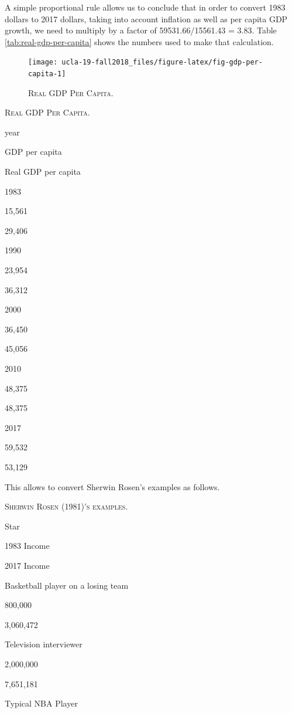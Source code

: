\documentclass[]{book}
\theoremstyle{definition}
\theoremstyle{definition}
\theoremstyle{definition}
\theoremstyle{remark}
\begin{document}
A simple proportional rule allows us to conclude that in order to
convert 1983 dollars to 2017 dollars, taking into account inflation as
well as per capita GDP growth, we need to multiply by a factor of
59531.66/15561.43 = 3.83. Table \ref{tab:real-gdp-per-capita} shows the
numbers used to make that calculation.



\begin{figure}

{\centering \texttt{[image: ucla-19-fall2018\_files/figure-latex/fig-gdp-per-capita-1]} 

}

\caption{\textsc{Real GDP Per Capita.}}\label{fig:fig-gdp-per-capita}
\end{figure}



\label{tab:real-gdp-per-capita}\textsc{Real GDP Per Capita.}

year

GDP per capita

Real GDP per capita

1983

15,561

29,406

1990

23,954

36,312

2000

36,450

45,056

2010

48,375

48,375

2017

59,532

53,129

This allows to convert Sherwin Rosen's examples as follows.



\label{tab:rosen-examples}\textsc{Sherwin Rosen (1981)'s examples.}

Star

1983 Income

2017 Income

Basketball player on a losing team

800,000

3,060,472

Television interviewer

2,000,000

7,651,181

Typical NBA Player
\end{document}
